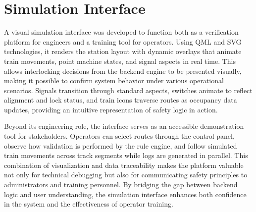 \section{Simulation Interface}
\label{sec:implementation:simulation-interface}

A visual simulation interface was developed to function both as a verification platform for engineers and a training tool for operators. Using QML and SVG technologies, it renders the station layout with dynamic overlays that animate train movements, point machine states, and signal aspects in real time. This allows interlocking decisions from the backend engine to be presented visually, making it possible to confirm system behavior under various operational scenarios. Signals transition through standard aspects, switches animate to reflect alignment and lock status, and train icons traverse routes as occupancy data updates, providing an intuitive representation of safety logic in action.

Beyond its engineering role, the interface serves as an accessible demonstration tool for stakeholders. Operators can select routes through the control panel, observe how validation is performed by the rule engine, and follow simulated train movements across track segments while logs are generated in parallel. This combination of visualization and data traceability makes the platform valuable not only for technical debugging but also for communicating safety principles to administrators and training personnel. By bridging the gap between backend logic and user understanding, the simulation interface enhances both confidence in the system and the effectiveness of operator training.